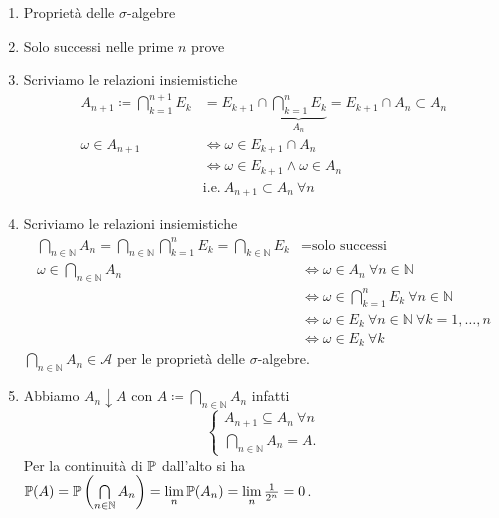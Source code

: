 \begin{enumerate}
	\item Proprietà delle $\sigma $-algebre
	\item Solo successi nelle prime $n$ prove
	\item Scriviamo le relazioni insiemistiche
	\begin{align*}
		A_{n+1} \coloneqq \bigcap\limits_{k=1}^{n+1} E_{k} & =E_{k+1} \cap \underbrace{\bigcap\limits_{k=1}^{n} E_{k}}_{A_{n}} =E_{k+1} \cap A_{n} \subset A_{n}\\
		\omega \in A_{n+1} & \iff \omega \in E_{k+1} \cap A_{n}\\
		 & \iff \omega \in E_{k+1} \land \omega \in A_{n}\\
		 & \text{i.e.} \ A_{n+1} \subset A_{n} \ \forall n
	\end{align*}
	\item Scriviamo le relazioni insiemistiche
	\begin{align*}
		\bigcap\limits_{n\in \mathbb{N}} A_{n} =\bigcap\limits_{n\in \mathbb{N}}\bigcap\limits_{k=1}^{n} E_{k} =\bigcap\limits_{k\in \mathbb{N}} E_{k} & =\text{solo successi}\\
		\omega \in \bigcap\limits_{n\in \mathbb{N}} A_{n} & \iff \omega \in A_{n} \ \forall n\in \mathbb{N}\\
		 & \iff \omega \in \bigcap\limits_{k=1}^{n} E_{k} \ \forall n\in \mathbb{N}\\
		 & \iff \omega \in E_{k} \ \forall n\in \mathbb{N} \ \forall k=1,\dots ,n\\
		 & \iff \omega \in E_{k} \ \forall k
	\end{align*}
	$\bigcap\limits_{n\in \mathbb{N}} A_{n} \in \mathcal{A}$ per le proprietà delle $\sigma $-algebre.
	\item Abbiamo $A_{n} \downarrow A$ con $A\coloneqq \bigcap\limits_{n\in \mathbb{N}} A_{n}$ infatti
	\[
		\begin{cases}
			A_{n+1} \subseteq A_{n} \ \forall n\\
			\bigcap_{n\in \mathbb{N}} A_{n} =A.
		\end{cases}
	\]
	Per la continuità di $\mathbb{P}$ dall'alto si ha $\mathbb{P}(A) =\mathbb{P}\left(\bigcap\limits_{n\in \mathbb{N}} A_{n}\right) =\lim\limits_{n}\mathbb{P}(A_{n}) =\lim\limits_{n}\frac{1}{2^{n}} =0$.
\end{enumerate}

\Soluzione

